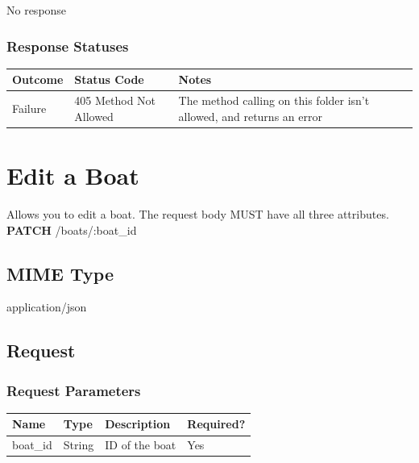 \documentclass[letterpaper,11pt,titlepage,draftclsnofoot,onecolumn,compsoc,utf8,latin1]{IEEEtran}
\begin{document}
\begin{singlespace}
No response

\subsubsection{Response Statuses}

\begin{center}
\begin{tabular}{ |p{}|p{}|p{}| } 
 \hline
 \textbf{Outcome} & \textbf{Status Code} & \textbf{Notes}  \\  \hline
 Failure & 405 Method Not Allowed & The method calling on this folder isn't allowed, and returns an error \\
 \hline
\end{tabular}
\end{center}

\newpage

\normalsize

\section{Edit a Boat}

Allows you to edit a boat. The request body MUST have all three attributes.\\

\noindent \textbf{PATCH} /boats/:boat\_id

\subsection{MIME Type}

application/json

\subsection{Request}

\subsubsection{Request Parameters}

\begin{center}
    \begin{tabular}{ | p{} | p{} | p{} | p{} |}
    \hline
        \textbf{Name} & \textbf{Type} & \textbf{Description} &\textbf{Required?}  \\ \hline
        boat\_id & String & ID of the boat & Yes \\
    \hline
    \end{tabular}
\end{center}

\end{singlespace}
\end{document}

